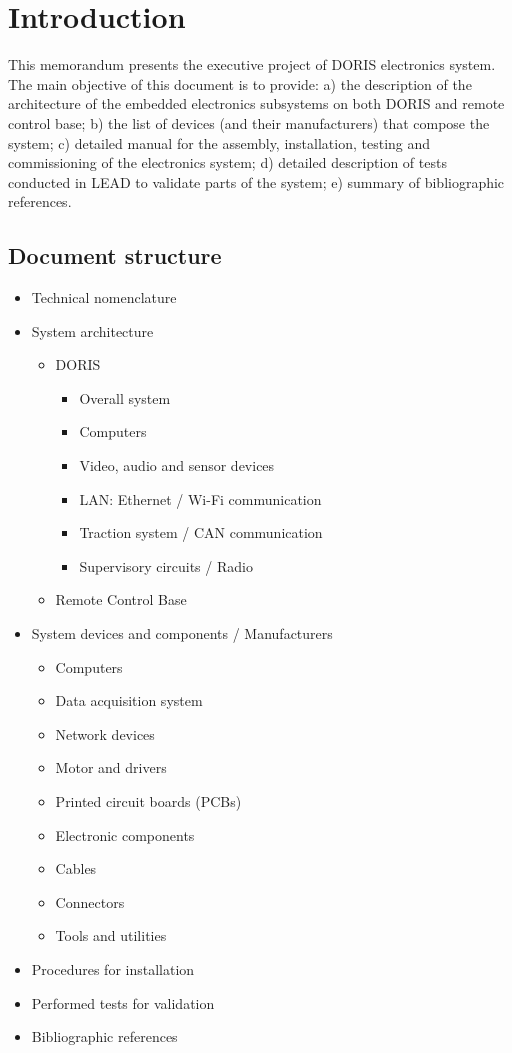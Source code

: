

\chapter{Introduction}
This memorandum presents the executive project of DORIS electronics system. The main objective of this document is to provide: a) the description of the architecture of the embedded electronics subsystems on both DORIS and remote control base; b) the list of devices (and their manufacturers) that compose the system; c) detailed manual for the assembly, installation, testing and commissioning of the electronics system; d) detailed description of tests conducted in LEAD to validate parts of the system; e) summary of bibliographic references.


\section{Document structure}
\begin{itemize}
  \item Technical nomenclature
  \item System architecture
  \begin{itemize}
    \item DORIS
    \begin{itemize}
      \item Overall system
      \item Computers
      \item Video, audio and sensor devices
      \item LAN: Ethernet / Wi-Fi communication
      \item Traction system / CAN communication
      \item Supervisory circuits / Radio
    \end{itemize}
    \item Remote Control Base
  \end{itemize}
  \item System devices and components / Manufacturers
  \begin{itemize}
    \item Computers
    \item Data acquisition system
    \item Network devices
    \item Motor and drivers
    \item Printed circuit boards (PCBs)
    \item Electronic components
    \item Cables
    \item Connectors
    \item Tools and utilities
  \end{itemize}
  \item Procedures for installation
  \item Performed tests for validation
  \item Bibliographic references
\end{itemize}

